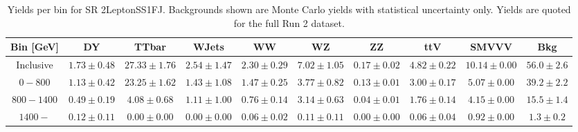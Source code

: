 \begin{table}[!htbp]
    \small
    \center
    \begin{tabular}{c|c|c|c|c|c|c|c|c||c}
    Bin [GeV] & DY & TTbar & WJets & WW & WZ & ZZ & ttV & SMVVV & Bkg\\
    \hline
    Inclusive & $1.73 \pm 0.48$ & $27.33 \pm 1.76$ & $2.54 \pm 1.47$ & $2.30 \pm 0.29$ & $7.02 \pm 1.05$ & $0.17 \pm 0.02$ & $4.82 \pm 0.22$ & $10.14 \pm 0.00$ & $56.0 \pm 2.6$\\
    \hline
    $0-800$ & $1.13 \pm 0.42$ & $23.25 \pm 1.62$ & $1.43 \pm 1.08$ & $1.47 \pm 0.25$ & $3.77 \pm 0.82$ & $0.13 \pm 0.01$ & $3.00 \pm 0.17$ & $5.07 \pm 0.00$ & $39.2 \pm 2.2$\\
    \hline
    $800-1400$ & $0.49 \pm 0.19$ & $4.08 \pm 0.68$ & $1.11 \pm 1.00$ & $0.76 \pm 0.14$ & $3.14 \pm 0.63$ & $0.04 \pm 0.01$ & $1.76 \pm 0.14$ & $4.15 \pm 0.00$ & $15.5 \pm 1.4$\\
    \hline
    $1400-$ & $0.12 \pm 0.11$ & $0.00 \pm 0.00$ & $0.00 \pm 0.00$ & $0.06 \pm 0.02$ & $0.11 \pm 0.11$ & $0.00 \pm 0.00$ & $0.06 \pm 0.04$ & $0.92 \pm 0.00$ & $1.3 \pm 0.2$\\
\end{tabular}
    \caption{Yields per bin for SR 2LeptonSS1FJ. Backgrounds shown are Monte Carlo yields with statistical uncertainty only. Yields are quoted for the full Run 2 dataset.}
    \label{tab:2LeptonSS1FJ$bins}
\end{table}
